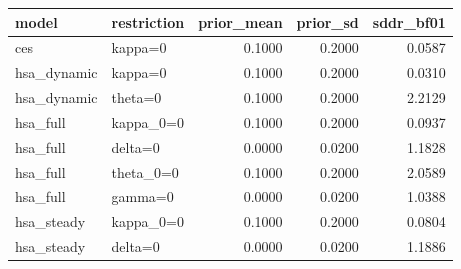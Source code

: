 \begin{tabular}{llrrr}
\toprule
model & restriction & prior\_mean & prior\_sd & sddr\_bf01 \\
\midrule
ces & kappa=0 & 0.1000 & 0.2000 & 0.0587 \\
hsa\_dynamic & kappa=0 & 0.1000 & 0.2000 & 0.0310 \\
hsa\_dynamic & theta=0 & 0.1000 & 0.2000 & 2.2129 \\
hsa\_full & kappa\_0=0 & 0.1000 & 0.2000 & 0.0937 \\
hsa\_full & delta=0 & 0.0000 & 0.0200 & 1.1828 \\
hsa\_full & theta\_0=0 & 0.1000 & 0.2000 & 2.0589 \\
hsa\_full & gamma=0 & 0.0000 & 0.0200 & 1.0388 \\
hsa\_steady & kappa\_0=0 & 0.1000 & 0.2000 & 0.0804 \\
hsa\_steady & delta=0 & 0.0000 & 0.0200 & 1.1886 \\
\bottomrule
\end{tabular}
